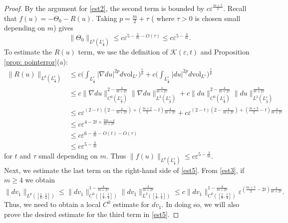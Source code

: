 \documentclass[11pt]{amsart}
\theoremstyle{definition}
\theoremstyle{remark}
\newcommand{\vol}{\mathrm{vol}}
\begin{document}
\begin{proof}
By the argument for \eqref{est2}, the second term is bounded by $c\varepsilon^{\frac{m+5}{2}}$. Recall that $f(u)=-\Theta_0-R(u)$.
    Taking $p = \frac{m}{2} + \tau$ ( where $\tau>0$ is chosen small depending on $m$) gives 
    \begin{equation*}
        \|\Theta_{0}\|_{L^p(L_{\frac{1}{8}}^\varepsilon)} \leq c \varepsilon^{5 - \frac{2}{m} - O(\tau)} \leq c\varepsilon^{5 - \frac{3}{m}}.
    \end{equation*}
   To estimate the $R(u)$ term, we use the definition of $\mathscr{K}(\varepsilon,t)$ and Proposition \ref{prop: pointerror}(a):
    \begin{align}
        \|R(u)\|_{L^p(L_{\frac{1}{8}}^\varepsilon)} &\leq c\Big(\int_{L_{\frac{1}{8}}^\varepsilon}|\nabla du|^{2p} d\vol_{L^\varepsilon}\Big)^{\frac{1}{p}}+c \Big(\int_{L_{\frac{1}{8}}^\varepsilon}| du|^{2p} d\vol_{L^\varepsilon}\Big)^{\frac{1}{p}}\nonumber  \\
        &\leq c\|\nabla du\|_{C^0(L_{\frac{1}{8}}^\varepsilon)}^{2- \frac{4}{m + 2\tau}} \|\nabla du\|_{L^2(L_{\frac{1}{8}}^\varepsilon)}^{\frac{4}{m+2\tau}}+c \|du\|_{C^0(L_{\frac{1}{8}}^\varepsilon)}^{2-\frac{4}{m+2\tau}}\lVert du\rVert_{L^2(L_{\frac{1}{8}}^\varepsilon)}^\frac{4}{m+2\tau}\nonumber \\
        &\leq c \varepsilon^{(2 - t)(2- \frac{4}{m + 2\tau}) + (\frac{m+2}{2} - t)\frac{4}{m+2\tau}}+c\varepsilon^{(2-t)(2-\frac{4}{m+2\tau})+(\frac{m+2}{2}-t)\frac{4}{m+2\tau}} \nonumber \\
        &\leq c \varepsilon^{4-2t + \frac{2m-4}{m+2\tau}} \nonumber \\ 
        &\leq c\varepsilon^{6-\frac{4}{m} - O(t) - O(\tau)} \nonumber \\ 
        &\leq c \varepsilon^{5 - \frac{3}{m}} \label{est011}
    \end{align}
    for $t$ and $\tau$ small depending on $m$. Thus $\|f(u)\|_{L^p(L_{\frac{1}{8}}^\varepsilon)} \leq c \varepsilon^{5 - \frac{3}{m}}$.\\
    Next, we estimate the last term on the right-hand side of \eqref{est5}. From \eqref{est3}, if $m\geq 4$ we obtain
    \begin{equation}
        \|dv_1\|_{L^p([\frac{1}{8},\frac{1}{4}])} \leq \|dv_1\|_{C^0([\frac{1}{8},\frac{1}{4}])}^{1 - \frac{4}{m+2\tau}} \|dv_1\|_{L^2([\frac{1}{8},\frac{1}{4}])}^{\frac{4}{m+2\tau}} \leq c\|dv_1\|_{C^0([\frac{1}{8},\frac{1}{4}])}^{1 - \frac{4}{m+2\tau}}\varepsilon^{(\frac{m+5}{2} - 2t)\frac{4}{m+2\tau}}.
        \label{est7}
    \end{equation}
    Thus, we need to obtain a local $C^0$ estimate for $dv_1$. In doing so, we will also prove the desired estimate for the third term in \eqref{est5}. 
    

\end{proof}
\end{document}

